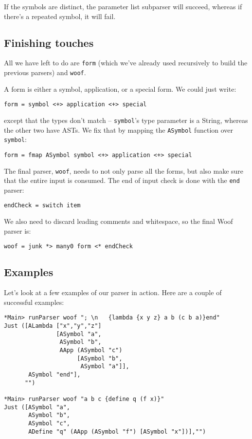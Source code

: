 \documentclass{tmr}
\begin{document}
If the symbols are distinct, the parameter list subparser will succeed,
whereas if there's a repeated symbol, it will fail.


\subsection{Finishing touches}
All we have left to do are \verb+form+ (which we've already used recursively
to build the previous parsers) and \verb+woof+.  

A form is either a symbol, application, or a special form.  We could just write:
\begin{verbatim}
form = symbol <+> application <+> special
\end{verbatim}

except that the types don't match -- \verb+symbol+'s type parameter is a String, 
whereas the other two have ASTs.  We fix that by mapping the \verb+ASymbol+ 
function over \verb+symbol+:
\begin{verbatim}
form = fmap ASymbol symbol <+> application <+> special
\end{verbatim}

The final parser, \verb+woof+, needs to not only parse all the forms, but also 
make sure that the entire input is consumed.  The end of input check is done 
with the \verb+end+ parser:
\begin{verbatim}
endCheck = switch item
\end{verbatim}

We also need to discard leading comments and whitespace, so the final Woof 
parser is:
\begin{verbatim}
woof = junk *> many0 form <* endCheck
\end{verbatim}


\subsection{Examples}
Let's look at a few examples of our parser in action.  Here are a couple of
successful examples:
\begin{verbatim}
*Main> runParser woof "; \n   {lambda {x y z} a b (c b a)}end"
Just ([ALambda ["x","y","z"] 
               [ASymbol "a",
                ASymbol "b",
                AApp (ASymbol "c") 
                     [ASymbol "b",
                      ASymbol "a"]],
       ASymbol "end"],
      "")

*Main> runParser woof "a b c {define q (f x)}"
Just ([ASymbol "a",
       ASymbol "b",
       ASymbol "c",
       ADefine "q" (AApp (ASymbol "f") [ASymbol "x"])],"")
\end{verbatim}
\end{document}
